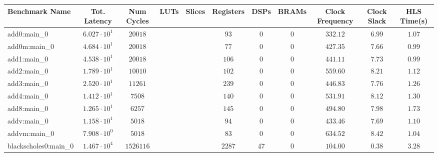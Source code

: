 \begin{tabular}{|l|c|c|c|c|c|c|c|c|c|c|}
\hline
Benchmark Name                 & Tot. Latency           & Num Cycles   & LUTs & Slices & Registers  & DSPs     & BRAMs        & Clock Frequency & Clock Slack & HLS Time(s) \\
\hline
add0:main\_0                   & $ 6.027 \cdot 10^{1} $ & $ 20018    $ & $  $ & $    $ & $ 93     $ & $ 0    $ & $ 0        $ & $ 332.12      $ & $ 6.99    $ & $ 1.07    $ \\
add0m:main\_0                  & $ 4.684 \cdot 10^{1} $ & $ 20018    $ & $  $ & $    $ & $ 77     $ & $ 0    $ & $ 0        $ & $ 427.35      $ & $ 7.66    $ & $ 0.99    $ \\
add1:main\_0                   & $ 4.538 \cdot 10^{1} $ & $ 20018    $ & $  $ & $    $ & $ 106    $ & $ 0    $ & $ 0        $ & $ 441.11      $ & $ 7.73    $ & $ 0.99    $ \\
add2:main\_0                   & $ 1.789 \cdot 10^{1} $ & $ 10010    $ & $  $ & $    $ & $ 102    $ & $ 0    $ & $ 0        $ & $ 559.60      $ & $ 8.21    $ & $ 1.12    $ \\
add3:main\_0                   & $ 2.520 \cdot 10^{1} $ & $ 11261    $ & $  $ & $    $ & $ 239    $ & $ 0    $ & $ 0        $ & $ 446.83      $ & $ 7.76    $ & $ 1.26    $ \\
add4:main\_0                   & $ 1.412 \cdot 10^{1} $ & $ 7508     $ & $  $ & $    $ & $ 140    $ & $ 0    $ & $ 0        $ & $ 531.91      $ & $ 8.12    $ & $ 1.30    $ \\
add8:main\_0                   & $ 1.265 \cdot 10^{1} $ & $ 6257     $ & $  $ & $    $ & $ 145    $ & $ 0    $ & $ 0        $ & $ 494.80      $ & $ 7.98    $ & $ 1.73    $ \\
addv:main\_0                   & $ 1.158 \cdot 10^{1} $ & $ 5018     $ & $  $ & $    $ & $ 94     $ & $ 0    $ & $ 0        $ & $ 433.46      $ & $ 7.69    $ & $ 1.10    $ \\
addvm:main\_0                  & $ 7.908 \cdot 10^{0} $ & $ 5018     $ & $  $ & $    $ & $ 83     $ & $ 0    $ & $ 0        $ & $ 634.52      $ & $ 8.42    $ & $ 1.04    $ \\
blackscholes0:main\_0          & $ 1.467 \cdot 10^{4} $ & $ 1526116  $ & $  $ & $    $ & $ 2287   $ & $ 47   $ & $ 0        $ & $ 104.00      $ & $ 0.38    $ & $ 3.28    $ \\

\end{tabular}
